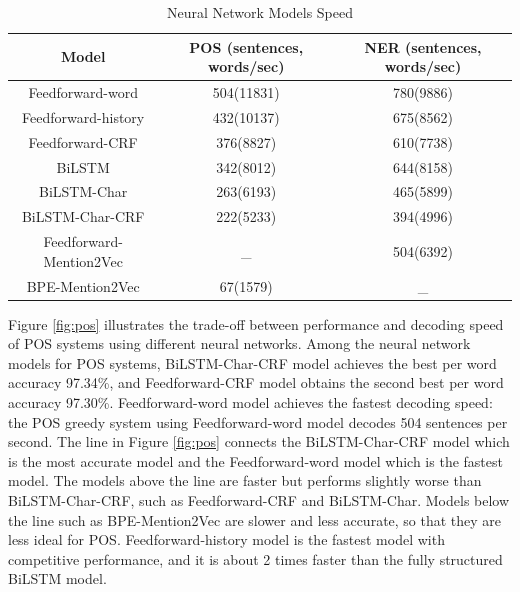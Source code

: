 \documentclass{sfuthesis}
\begin{document}
\begin{table}[]
\centering
\caption{Neural Network Models Speed}
\label{table:my-label2}
\begin{tabular}{|c|c|c|}
\hline
Model       & POS  (sentences, words/sec)  & NER  (sentences, words/sec)      \\ \hline
Feedforward-word    & 504(11831)     & 780(9886)    \\ \hline
Feedforward-history & 432(10137)     & 675(8562)     \\ \hline
Feedforward-CRF     & 376(8827)     & 610(7738)     \\ \hline
BiLSTM             & 342(8012)     & 644(8158)       \\ \hline
BiLSTM-Char        & 263(6193)  & 465(5899)             \\ \hline
BiLSTM-Char-CRF    & 222(5233)  & 394(4996)         \\ \hline
Feedforward-Mention2Vec         & _      & 504(6392)              \\ \hline
BPE-Mention2Vec     & 67(1579)  &  _               \\ \hline   
\end{tabular}
\end{table}

Figure \ref{fig:pos} illustrates the trade-off between performance and decoding speed of POS systems using different neural networks. Among the neural network models for POS systems, BiLSTM-Char-CRF model achieves the best per word accuracy 97.34\%, and Feedforward-CRF model obtains the second best per word accuracy 97.30\%. Feedforward-word model achieves the fastest decoding speed: the POS greedy system using Feedforward-word model decodes 504 sentences per second. The line in Figure \ref{fig:pos} connects the BiLSTM-Char-CRF model which is the most accurate model and the Feedforward-word model which is the fastest model. The models above the line are faster but performs slightly worse than BiLSTM-Char-CRF, such as Feedforward-CRF and BiLSTM-Char. Models below the line such as BPE-Mention2Vec are slower and less accurate, so that they are less ideal for POS. Feedforward-history model is the fastest model with competitive performance, and it is about 2 times faster than the fully structured BiLSTM model.
\end{document}
